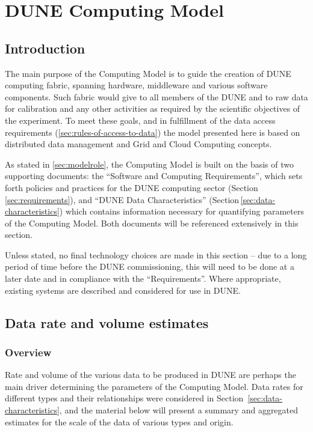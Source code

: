 \section{DUNE Computing Model}
\label{sec:computing_model}

\subsection{Introduction}
The main purpose of the Computing Model is to guide the creation of DUNE computing fabric, spanning
hardware, middleware and various software components. Such fabric would give to all members of the DUNE
and to raw data for calibration and any other activities as required by the scientific objectives of the experiment.
To meet these goals, and in fulfillment of the data access requirements (\ref{sec:rules-of-access-to-data})
the model presented here is based on distributed data management and Grid and Cloud Computing concepts.

As stated in \ref{sec:modelrole}, the Computing Model is built on the basis of two supporting documents: the
``Software and Computing Requirements'', which sets forth policies and practices for the DUNE computing sector
(Section\,\ref{sec:requirements}), and ``DUNE Data Characteristics'' (Section\,\ref{sec:data-characteristics}) which contains information
necessary for quantifying parameters of the Computing Model. Both documents will be referenced extensively in this section.

Unless stated, no final technology choices are made in this section -- due to a long period of time before the DUNE commissioning,
this will need to be done at a later date and in compliance with the ``Requirements''. Where appropriate, existing systems are described and
considered for use in DUNE.

\subsection{Data rate and volume estimates}

\subsubsection{Overview}
Rate and volume of the various data to be produced in DUNE are perhaps the main driver determining the parameters
of the Computing Model. Data rates for different types and their relationships were considered in Section~\ref{sec:data-characteristics},
and the material below will present a summary and aggregated estimates for the scale of the data of various types
and origin.

